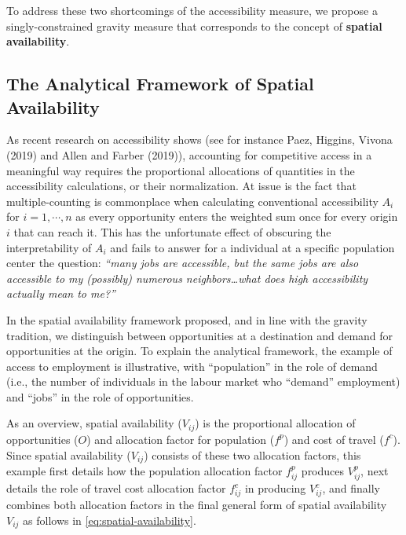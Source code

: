 \documentclass[]{elsarticle} %
\begin{document}
To address these two shortcomings of the accessibility measure, we
propose a singly-constrained gravity measure that corresponds to the
concept of \textbf{spatial availability}.

\hypertarget{the-analytical-framework-of-spatial-availability}{%
\subsection{The Analytical Framework of Spatial
Availability}\label{the-analytical-framework-of-spatial-availability}}

As recent research on accessibility shows (see for instance Paez,
Higgins, Vivona (2019) and Allen and Farber (2019)), accounting for
competitive access in a meaningful way requires the proportional
allocations of quantities in the accessibility calculations, or their
normalization. At issue is the fact that multiple-counting is
commonplace when calculating conventional accessibility \(A_i\) for
\(i=1,\cdots,n\) as every opportunity enters the weighted sum once for
every origin \(i\) that can reach it. This has the unfortunate effect of
obscuring the interpretability of \(A_i\) and fails to answer for a
individual at a specific population center the question: \emph{``many
jobs are accessible, but the same jobs are also accessible to my
(possibly) numerous neighbors\ldots what does high accessibility
actually mean to me?''}

In the spatial availability framework proposed, and in line with the
gravity tradition, we distinguish between opportunities at a destination
and demand for opportunities at the origin. To explain the analytical
framework, the example of access to employment is illustrative, with
``population'' in the role of demand (i.e., the number of individuals in
the labour market who ``demand'' employment) and ``jobs'' in the role of
opportunities.

As an overview, spatial availability (\(V_{ij}\)) is the proportional
allocation of opportunities (\(O\)) and allocation factor for population
(\(f^p\)) and cost of travel (\(f^c\)). Since spatial availability
(\(V_{ij}\)) consists of these two allocation factors, this example
first details how the population allocation factor \(f^p_{ij}\) produces
\(V^p_{ij}\), next details the role of travel cost allocation factor
\(f^c_{ij}\) in producing \(V^c_{ij}\), and finally combines both
allocation factors in the final general form of spatial availability
\(V_{ij}\) as follows in \ref{eq:spatial-availability}.
\end{document}

